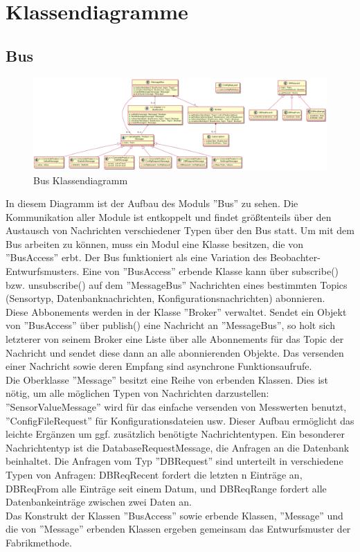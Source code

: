 \documentclass[entwurf.tex]{subfiles}
\begin{document}
\chapter{Klassendiagramme}
	\section{Bus}
		\begin{figure}[H]
  			\begin{center}
 				\includegraphics[width=0.8\textheight,angle=90]{diagrams/Bus.png}
  				\caption{Bus Klassendiagramm}
  			\end{center}
  		\end{figure}
  		In diesem Diagramm ist der Aufbau des Moduls ''Bus'' zu sehen. Die Kommunikation aller Module ist entkoppelt und findet größtenteils über den Austausch von Nachrichten verschiedener Typen über den Bus statt. Um mit dem Bus arbeiten zu können, muss ein Modul eine Klasse besitzen, die von ''BusAccess'' erbt. Der Bus funktioniert als eine Variation des Beobachter-Entwurfsmusters. Eine von ''BusAccess'' erbende Klasse kann über subscribe() bzw. unsubscribe() auf dem ''MessageBus'' Nachrichten eines bestimmten Topics (Sensortyp, Datenbanknachrichten, Konfigurationsnachrichten) abonnieren. \\
  		Diese Abbonements werden in der Klasse ''Broker'' verwaltet. Sendet ein Objekt von ''BusAccess'' über publish() eine Nachricht an ''MessageBus'', so holt sich letzterer von seinem Broker eine Liste über alle Abonnements für das Topic der Nachricht und sendet diese dann an alle abonnierenden Objekte. Das versenden einer Nachricht sowie deren Empfang sind asynchrone Funktionsaufrufe. \\
  		Die Oberklasse ''Message'' besitzt eine Reihe von erbenden Klassen. Dies ist nötig, um alle möglichen Typen von Nachrichten darzustellen: ''SensorValueMessage'' wird für das einfache versenden von Messwerten benutzt, ''ConfigFileRequest'' für Konfigurationsdateien usw. Dieser Aufbau ermöglicht das leichte Ergänzen um ggf. zusätzlich benötigte Nachrichtentypen. Ein besonderer Nachrichtentyp ist die DatabaseRequestMessage, die Anfragen an die Datenbank beinhaltet. Die Anfragen vom Typ ''DBRequest'' sind unterteilt in verschiedene Typen von Anfragen: DBReqRecent fordert die letzten n Einträge an, DBReqFrom alle Einträge seit einem Datum, und DBReqRange fordert alle Datenbankeinträge zwischen zwei Daten an. \\
  		Das Konstrukt  der Klassen ''BusAccess'' sowie erbende Klassen, ''Message'' und die von ''Message'' erbenden Klassen ergeben gemeinsam das Entwurfsmuster der Fabrikmethode. 
  		
\end{document}
